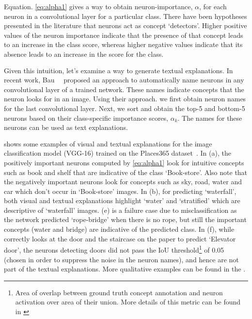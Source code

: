 Equation. \eqref{eq:alpha1} gives a way to obtain neuron-importance, $\alpha{}$, for each neuron in a convolutional layer for a particular class.
There have been hypotheses presented in the literature \cite{Zhou2014ObjectDE,zeiler_eccv14} that neurons act as concept `detectors'.
Higher positive values of the neuron importance indicate that the presence of that concept leads to an increase in the class score,
whereas higher negative values indicate that its absence leads to an increase in the score for the class.

Given this intuition, let's examine a way to generate textual explanations.
In recent work, Bau~\etal~\cite{netdissect} proposed an approach to automatically name
neurons in any convolutional layer of a trained network.
These names indicate concepts that the neuron looks for in an image.
Using their approach. we first obtain neuron names for the last convolutional layer. %
Next, we sort and obtain the top-5 and bottom-5 neurons based on their class-specific importance scores, $\alpha_k$.
The names for these neurons can be used as text explanations.

 shows some examples of visual and textual explanations for the
image classification model (VGG-16) trained on the Places365 dataset~\cite{zhou2017places}.
In (a), the positively important neurons computed by \eqref{eq:alpha1} look for intuitive
concepts such as book and shelf that are indicative of the class `Book-store'.
Also note that the negatively important neurons look for concepts such as sky, road, water and car which don't occur in `Book-store' images.
In (b), for predicting `waterfall', both visual and textual explanations highlight
`water' and `stratified' which are descriptive of `waterfall' images.
(e) is a failure case due to misclassification as the network predicted
`rope-bridge' when there is no rope, but still the important concepts (water
and bridge) are indicative of the predicted class.
In (f), while \gcam{} correctly looks at the door and the staircase on the
paper to predict `Elevator door', the neurons detecting doors did not pass the
IoU threshold\footnote{Area of overlap between ground truth concept annotation and neuron activation over area of their union. More details of this metric can be found in \cite{netdissect}} of 0.05 (chosen in order to suppress the noise in the neuron names),
and hence are not part of the textual explanations. More qualitative examples
can be found in the .


